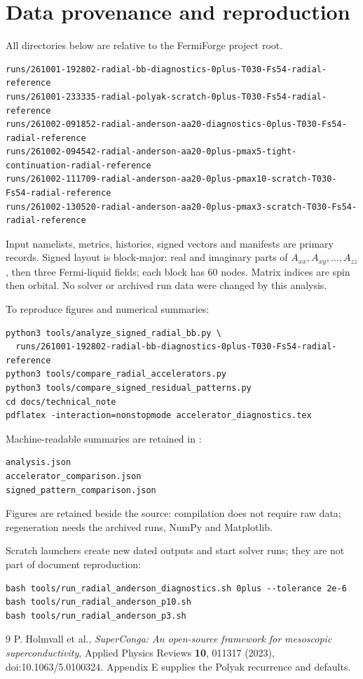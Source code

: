 \documentclass[11pt,a4paper]{article}
\begin{document}
\clearpage
\section{Data provenance and reproduction}
All directories below are relative to the FermiForge project root.
\begin{lstlisting}
runs/261001-192802-radial-bb-diagnostics-0plus-T030-Fs54-radial-reference
runs/261001-233335-radial-polyak-scratch-0plus-T030-Fs54-radial-reference
runs/261002-091852-radial-anderson-aa20-diagnostics-0plus-T030-Fs54-radial-reference
runs/261002-094542-radial-anderson-aa20-0plus-pmax5-tight-continuation-radial-reference
runs/261002-111709-radial-anderson-aa20-0plus-pmax10-scratch-T030-Fs54-radial-reference
runs/261002-130520-radial-anderson-aa20-0plus-pmax3-scratch-T030-Fs54-radial-reference
\end{lstlisting}
Input namelists, metrics, histories, signed vectors and manifests are primary
records. Signed layout is block-major: real and imaginary parts of
$A_{xx},A_{xy},\ldots,A_{zz}$, then three Fermi-liquid fields; each block
has 60 nodes. Matrix indices are spin then orbital. No solver or archived
run data were changed by this analysis.

To reproduce figures and numerical summaries:
\begin{lstlisting}
python3 tools/analyze_signed_radial_bb.py \
  runs/261001-192802-radial-bb-diagnostics-0plus-T030-Fs54-radial-reference
python3 tools/compare_radial_accelerators.py
python3 tools/compare_signed_residual_patterns.py
cd docs/technical_note
pdflatex -interaction=nonstopmode accelerator_diagnostics.tex
\end{lstlisting}
Machine-readable summaries are retained in :
\begin{lstlisting}
analysis.json
accelerator_comparison.json
signed_pattern_comparison.json
\end{lstlisting}
Figures are retained beside the source: compilation does not require raw
data; regeneration needs the archived runs, NumPy and Matplotlib.

Scratch launchers create new dated outputs and start solver runs; they are
not part of document reproduction:
\begin{lstlisting}
bash tools/run_radial_anderson_diagnostics.sh 0plus --tolerance 2e-6
bash tools/run_radial_anderson_p10.sh
bash tools/run_radial_anderson_p3.sh
\end{lstlisting}
\begin{thebibliography}{9}
P. Holmvall et al., \emph{SuperConga: An open-source framework for mesoscopic
superconductivity}, Applied Physics Reviews \textbf{10}, 011317 (2023),
doi:10.1063/5.0100324. Appendix E supplies the Polyak recurrence and defaults.
\end{thebibliography}
\end{document}

